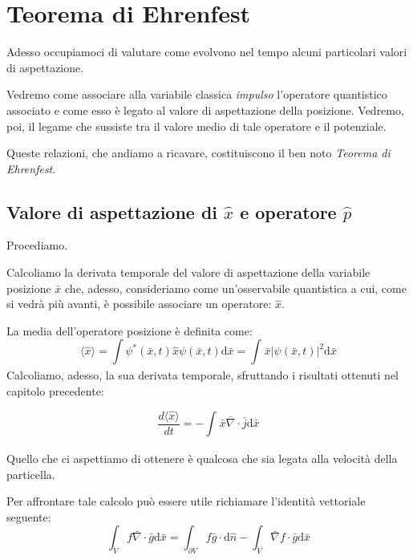 \chapter{Teorema di Ehrenfest} %
Adesso occupiamoci di valutare come evolvono nel tempo alcuni particolari valori di aspettazione.

Vedremo come associare alla variabile classica \emph{impulso} l'operatore quantistico associato e come esso è legato al valore di aspettazione della posizione. Vedremo, poi, il legame che sussiste tra il valore medio di tale operatore e il potenziale.

Queste relazioni, che andiamo a ricavare, costituiscono il ben noto \emph{Teorema di Ehrenfest}.

\section[Valore di aspettazione di x]{Valore di aspettazione di $\hat x$ e operatore $\hat p$} %
Procediamo.

Calcoliamo la derivata temporale del valore di aspettazione della variabile posizione $\bar x$ che, adesso, consideriamo come un'osservabile quantistica a cui, come si vedrà più avanti, è possibile associare un operatore: $\hat x$.

La media dell'operatore posizione è definita come:
\begin{equation}
\langle \hat x\rangle=\int \psi^*(\bar x,t)\hat x \psi(\bar x,t) \textrm{d}\bar x=\int_{}^{}{\bar x |\psi \left(\bar x,t\right)|^2 \textrm{d}\bar x}
\end{equation}
Calcoliamo, adesso, la sua derivata temporale, sfruttando i risultati ottenuti nel capitolo precedente:

\begin{equation}
\frac{d\langle \hat x\rangle}{dt}=-\int_{}^{}{\bar x \bar \nabla \cdot \bar j \textrm{d}\bar x}
\end{equation}

Quello che ci aspettiamo di ottenere è qualcosa che sia legata alla velocità della particella.

Per affrontare tale calcolo può essere utile richiamare l'identità vettoriale seguente:
\begin{equation}
\int_{V}^{}{f\bar \nabla \cdot \bar g \textrm{d}\bar x}=\int_{\partial V}^{}{f \bar g \cdot \textrm{d}\hat {n}}-\int_{V}^{}{\bar \nabla f\cdot \bar g \textrm{d}\bar x}
\end{equation}

